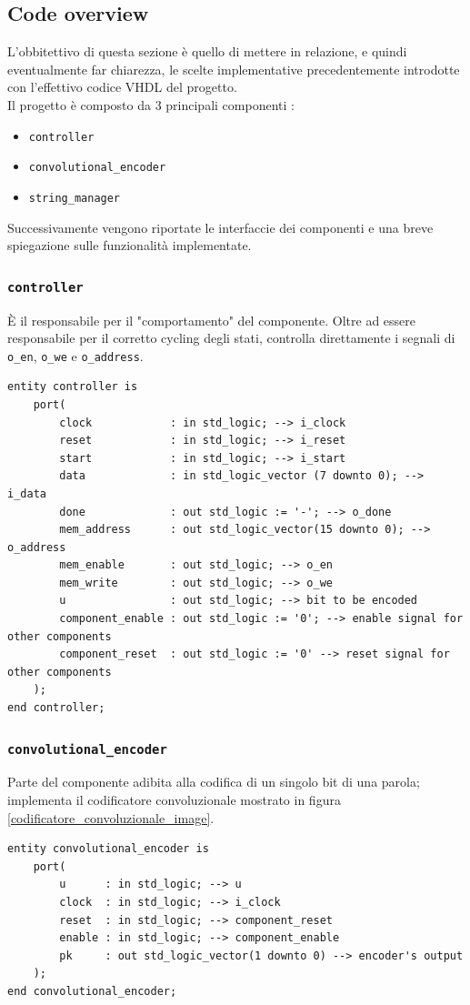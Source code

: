 \documentclass[11pt,a4paper]{article}
\begin{document}
        \subsection{Code overview}
            L'obbitettivo di questa sezione è quello di mettere in relazione, e quindi eventualmente far chiarezza, le scelte implementative precedentemente introdotte con l'effettivo codice VHDL del progetto.\\
            Il progetto è composto da 3 principali componenti :
            \begin{itemize}
                \item \texttt{controller}
                \item \texttt{convolutional\_encoder}
                \item \texttt{string\_manager}
            \end{itemize}
            Successivamente vengono riportate le interfaccie dei componenti e una breve spiegazione sulle funzionalità implementate.
            \subsubsection{\texttt{controller}}
            È il responsabile per il "comportamento" del componente. Oltre ad essere responsabile per il corretto cycling degli stati, controlla direttamente i segnali di \texttt{o\_en}, \texttt{o\_we} e \texttt{o\_address}. 
                \begin{verbatim}
entity controller is
    port(
        clock            : in std_logic; --> i_clock
        reset            : in std_logic; --> i_reset
        start            : in std_logic; --> i_start
        data             : in std_logic_vector (7 downto 0); --> i_data
        done             : out std_logic := '-'; --> o_done
        mem_address      : out std_logic_vector(15 downto 0); --> o_address
        mem_enable       : out std_logic; --> o_en
        mem_write        : out std_logic; --> o_we
        u                : out std_logic; --> bit to be encoded
        component_enable : out std_logic := '0'; --> enable signal for other components
        component_reset  : out std_logic := '0' --> reset signal for other components
    );
end controller;
                \end{verbatim}
            \subsubsection{\texttt{convolutional\_encoder}}
                Parte del componente adibita alla codifica di un singolo bit di una parola; implementa il codificatore convoluzionale mostrato in figura \ref{codificatore_convoluzionale_image}.
                \begin{verbatim}
entity convolutional_encoder is 
    port(
        u      : in std_logic; --> u
        clock  : in std_logic; --> i_clock
        reset  : in std_logic; --> component_reset
        enable : in std_logic; --> component_enable
        pk     : out std_logic_vector(1 downto 0) --> encoder's output
    );
end convolutional_encoder;
                \end{verbatim}
\end{document}
